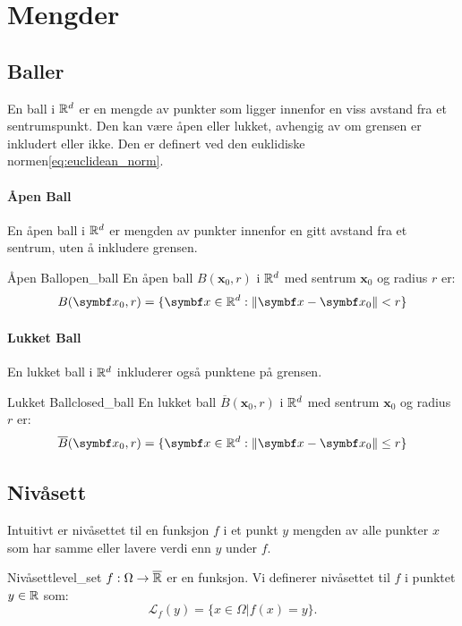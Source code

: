 \section{Mengder}

\subsection{Baller}
En ball i \(\mathbb{R}^d\) er en mengde av punkter som ligger innenfor en viss avstand fra et sentrumspunkt. Den kan være åpen eller lukket, avhengig av om grensen er inkludert eller ikke.
Den er definert ved den euklidiske normen\eqref{eq:euclidean_norm}.

\paragraph{Åpen Ball}
En åpen ball i \(\mathbb{R}^d\) er mengden av punkter innenfor en gitt avstand fra et sentrum, uten å inkludere grensen.
\begin{definition}{Åpen Ball}{open_ball}
	En åpen ball \(B(\mathbf{x}_0, r)\) i \(\mathbb{R}^d\) med sentrum \(\mathbf{x}_0\) og radius \(r\) er:
	\[
		B(\mathbf{x}_0, r) = \{ \mathbf{x} \in \R^d : \norm{\mathbf{x} - \mathbf{x}_0} < r \}
	\]
\end{definition}

\paragraph{Lukket Ball}
En lukket ball i \(\mathbb{R}^d\) inkluderer også punktene på grensen.

\begin{definition}{Lukket Ball}{closed_ball}
	En lukket ball \(\overline{B}(\mathbf{x}_0, r)\) i \(\mathbb{R}^d\) med sentrum \(\mathbf{x}_0\) og radius \(r\) er:
	\[
		\overline{B}(\mathbf{x}_0, r) = \{ \mathbf{x} \in \R^d : \norm{\mathbf{x} - \mathbf{x}_0} \leq r \}
	\]
\end{definition}

\subsection{Nivåsett}
Intuitivt er nivåsettet til en funksjon \( f \) i et punkt \( y \) mengden av alle punkter \( x \) som har samme eller lavere verdi enn \( y \) under \( f \).
\begin{definition}{Nivåsett}{level_set}
	\(f: \Omega \to \overline{\mathbb{R}}\) er en funksjon. Vi definerer nivåsettet til \(f\) i punktet \(y \in \mathbb{R}\) som:
	\[
		\mathcal{L}_f(y) = \{x \in \Omega | f(x) = y\}.
	\]
\end{definition}

